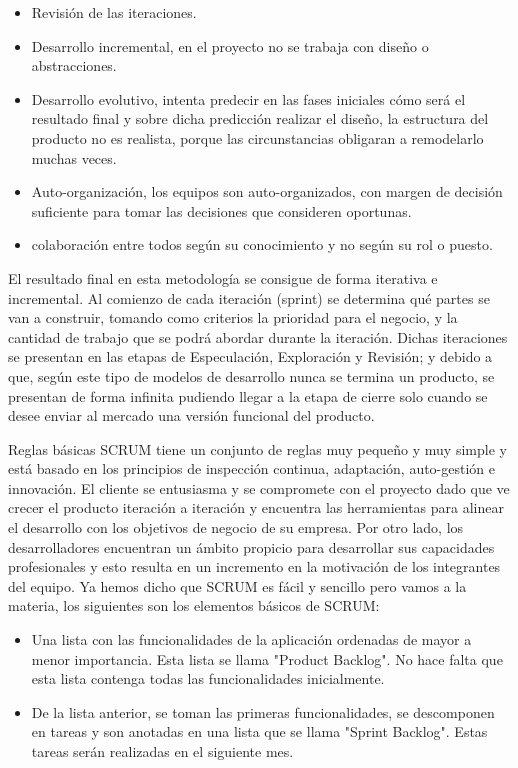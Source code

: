 \begin{itemize}
 \item Revisión de las iteraciones.
 \item Desarrollo incremental, en el proyecto no se trabaja con diseño o abstracciones.
 \item Desarrollo evolutivo, intenta predecir en las fases iniciales cómo será el resultado final y sobre dicha predicción realizar el diseño, la estructura del producto no es realista, porque las circunstancias obligaran a remodelarlo muchas veces.
 \item Auto-organización, los equipos son auto-organizados, con margen de decisión suficiente para tomar las decisiones que consideren oportunas.
 \item colaboración entre todos según su conocimiento y no según su rol o puesto.

\end{itemize}

El resultado final en esta metodología se consigue de forma iterativa e incremental. Al comienzo de cada iteración (sprint) se determina qué partes se van a construir, tomando como criterios la prioridad para el negocio, y la cantidad de trabajo que se podrá abordar durante la iteración. Dichas iteraciones se presentan en las etapas de Especulación, Exploración y Revisión; y debido a que, según este tipo de modelos de desarrollo nunca se termina un producto, se presentan de forma infinita pudiendo llegar a la etapa de cierre solo cuando se desee enviar al mercado una versión funcional del producto.

Reglas básicas
SCRUM tiene un conjunto de reglas muy pequeño y muy simple y está basado en los principios de inspección continua, adaptación, auto-gestión e innovación.
El cliente se entusiasma y se compromete con el proyecto dado que ve crecer el producto iteración a iteración y encuentra las herramientas para alinear el desarrollo
con los objetivos de negocio de su empresa.
Por otro lado, los desarrolladores encuentran un ámbito propicio para desarrollar sus capacidades profesionales y esto resulta en un incremento en la motivación de los
integrantes del equipo.
Ya hemos dicho que SCRUM es fácil y sencillo pero vamos a la materia, los siguientes son los elementos básicos de SCRUM:
\begin{itemize}
 \item Una lista con las funcionalidades de la aplicación ordenadas de mayor a menor importancia. Esta lista se llama "Product Backlog". No hace falta que esta lista contenga todas las funcionalidades inicialmente.
 \item De la lista anterior, se toman las primeras funcionalidades, se descomponen en tareas y son anotadas en una lista que se llama "Sprint Backlog". Estas tareas serán realizadas en el siguiente mes.
\end{itemize}

